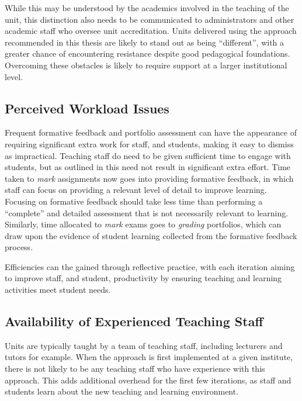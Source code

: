 While this may be understood by the academics involved in the teaching of the unit, this distinction also needs to be communicated to administrators and other academic staff who oversee unit accreditation. Units delivered using the approach recommended in this thesis are likely to stand out as being ``different'', with a greater chance of encountering resistance despite good pedagogical foundations. Overcoming these obstacles is likely to require support at a larger institutional level. 


\subsection{Perceived Workload Issues} %
\label{sub:perceived_workload_issues}

Frequent formative feedback and portfolio assessment can have the appearance of requiring significant extra work for staff, and students, making it easy to dismiss as impractical. Teaching staff do need to be given sufficient time to engage with students, but as outlined in  this need not result in significant extra effort. Time taken to \emph{mark} assignments now goes into providing formative feedback, in which staff can focus on providing a relevant level of detail to improve learning. Focusing on formative feedback should take less time than performing a ``complete'' and detailed assessment that is not necessarily relevant to learning. Similarly, time allocated to \emph{mark} exams goes to \emph{grading} portfolios, which can draw upon the evidence of student learning collected from the formative feedback process.

Efficiencies can the gained through reflective practice, with each iteration aiming to improve staff, and student, productivity by ensuring teaching and learning activities meet student needs.


\subsection{Availability of Experienced Teaching Staff} %
\label{sub:availability_of_teaching_staff}

Units are typically taught by a team of teaching staff, including lecturers and tutors for example. When the approach is first implemented at a given institute, there is not likely to be any teaching staff who have experience with this approach. This adds additional overhead for the first few iterations, as staff and students learn about the new teaching and learning environment.


